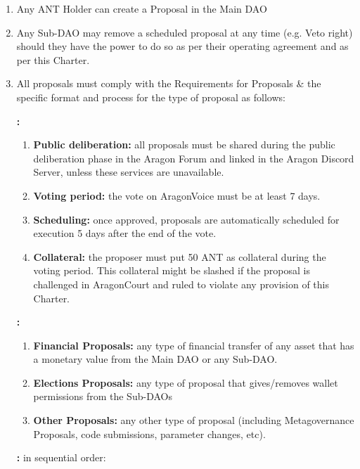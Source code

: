 \begin{enumerate}
\begin{enumerate}
	\end{enumerate}

	\begin{enumerate}
		
		\item Any \ac{ANT} Holder can create a Proposal in the Main \ac{DAO}
		\item Any Sub-\ac{DAO} may remove a scheduled proposal at any time (e.g. Veto right) should they have the power to do so as per their operating agreement and as per this Charter.
		\item All proposals must comply with the Requirements for Proposals \& the specific format and process for the type of proposal as follows:
		
		\textbf{:}
		\begin{enumerate}
			\item \textbf{Public deliberation:} all proposals must be shared during the public deliberation phase in the Aragon Forum and linked in the Aragon Discord Server, unless these services are unavailable.
			\item \textbf{Voting period:} the vote on \gls{AragonVoice} must be at least 7 days.
			\item \textbf{Scheduling:} once approved, proposals are automatically scheduled for execution 5 days after the end of the vote.
			\item \textbf{Collateral:} the proposer must put 50 \ac{ANT} as collateral during the voting period.
			This collateral might be slashed if the proposal is challenged in \gls{AragonCourt} and ruled to violate any provision of this Charter.
		\end{enumerate}
	
		\textbf{:}
		\begin{enumerate}		
			\item \textbf{Financial Proposals:} any type of financial transfer of any asset that has a monetary value from the Main \ac{DAO} or any Sub-\ac{DAO}.
			\item \textbf{Elections Proposals:} any type of proposal that gives/removes wallet permissions from the Sub-\acp{DAO}
			\item \textbf{Other Proposals:} any other type of proposal (including Metagovernance Proposals, code submissions, parameter changes, etc).
		\end{enumerate}

		\textbf{:} in sequential order:
	

\end{enumerate}
\end{enumerate}
